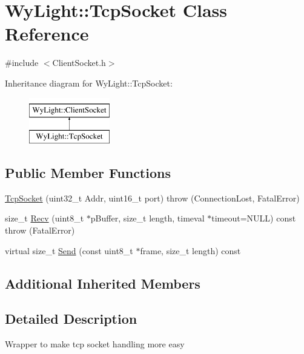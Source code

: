 \hypertarget{class_wy_light_1_1_tcp_socket}{\section{Wy\-Light\-:\-:Tcp\-Socket Class Reference}
\label{class_wy_light_1_1_tcp_socket}
}


{\ttfamily \#include $<$Client\-Socket.\-h$>$}

Inheritance diagram for Wy\-Light\-:\-:Tcp\-Socket\-:\begin{figure}[H]
\begin{center}
\leavevmode
\includegraphics[height=2.000000cm]{class_wy_light_1_1_tcp_socket}
\end{center}
\end{figure}
\subsection*{Public Member Functions}
\begin{DoxyCompactItemize}
\item 
\hyperlink{class_wy_light_1_1_tcp_socket_a69045a3bf0b959b50b2b4d2a18ee06c1}{Tcp\-Socket} (uint32\-\_\-t Addr, uint16\-\_\-t port)  throw (\-Connection\-Lost, Fatal\-Error)
\item 
size\-\_\-t \hyperlink{class_wy_light_1_1_tcp_socket_aef83b055add4c47c4ab6b3395559ca27}{Recv} (uint8\-\_\-t $\ast$p\-Buffer, size\-\_\-t length, timeval $\ast$timeout=N\-U\-L\-L) const   throw (\-Fatal\-Error)
\item 
virtual size\-\_\-t \hyperlink{class_wy_light_1_1_tcp_socket_acd2ed7e05e7a8efc55b01e422d957857}{Send} (const uint8\-\_\-t $\ast$frame, size\-\_\-t length) const 
\end{DoxyCompactItemize}
\subsection*{Additional Inherited Members}


\subsection{Detailed Description}
Wrapper to make tcp socket handling more easy 

